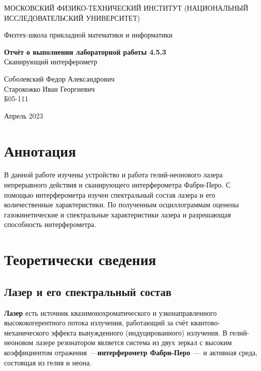 \documentclass[a4paper,12pt]{article} %
\date{\today}
\begin{document}
\begin{titlepage}
	\begin{center}
		{\large МОСКОВСКИЙ ФИЗИКО-ТЕХНИЧЕСКИЙ ИНСТИТУТ (НАЦИОНАЛЬНЫЙ ИССЛЕДОВАТЕЛЬСКИЙ УНИВЕРСИТЕТ)}
	\end{center}
	\begin{center}
		{\large Физтех-школа прикладной математики и информатики}
	\end{center}
	
	
	\vspace{4.5cm}
	{\huge
		\begin{center}
			{\bf Отчёт о выполнении лабораторной работы 4.5.3}\\
			Сканирующий интерферометр
		\end{center}
	}
	\vspace{1cm}
	\begin{center}
		{\large Соболевский Федор Александрович \\
                    Старокожко Иван Георгиевич \\
			\vspace{0.2cm}
			Б05-111}
	\end{center}
	\vspace{8cm}
	\begin{center}
		  Апрель 2023
	\end{center}
\end{titlepage}

\section{Аннотация}
В данной работе изучены устройство и работа гелий-неонового лазера непрерывного действия и сканирующего интерферометра Фабри-Перо. С помощью интерферометра изучен спектральный состав лазера и его количественные характеристики. По полученным осциллограммам оценены газокинетические и спектральные характеристики лазера и разрешающая способность интерферометра.

\section{Теоретически сведения}
\subsection*{Лазер и его спектральный состав}
\textbf{Лазер} есть источник квазимонохроматического и узконаправленного высококогерентного потока излучения, работающий за счёт квантово-механического эффекта вынужденного (индуцированного) излучения. В гелий-неоновом лазере резонатором является система из двух зеркал с высоким коэффициентом отражения~---\textbf{интерферометр Фабри-Перо}~--- и активная среда, состоящая из гелия и неона.
\end{document}
